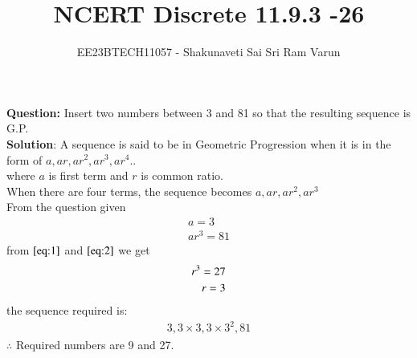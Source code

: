 \documentclass[journal,12pt,twocolumn]{IEEEtran}
\theoremstyle{remark}
\begin{document}

\vspace{3cm}

\title{NCERT Discrete 11.9.3 -26}
\author{EE23BTECH11057 - Shakunaveti Sai Sri Ram Varun$^{}$%
}
\maketitle
\newpage
\bigskip

\renewcommand{\thefigure}{\theenumi}
\renewcommand{\thetable}{\theenumi}
\vspace{2cm}
\textbf{Question: }
Insert two numbers between 3 and 81 so that the resulting sequence is G.P.\\
\textbf{Solution}:
A sequence is said to be in Geometric Progression when it is in the form of $ a, ar, ar^2, ar^3, ar^4..$\\
where $a$ is first term and $r$ is common ratio.\\
When there are four terms, the sequence becomes $ a, ar, ar^2, ar^3$\\
From the question given
\begin{align}
a = 3 \label{eq:1}\\
ar^3 = 81 \label{eq:2}
\end{align}
from $ \eqref{eq:1}$ and $ \eqref{eq:2}$ we get
\begin{align}
\notag r^3 = 27 \\
\notag r = 3
\end{align}
the sequence required is:
\begin{align}
3, 3 \times 3, 3 \times 3^2, 81
\end{align}
$ \therefore $ Required numbers are 9 and 27.
\end{document}
